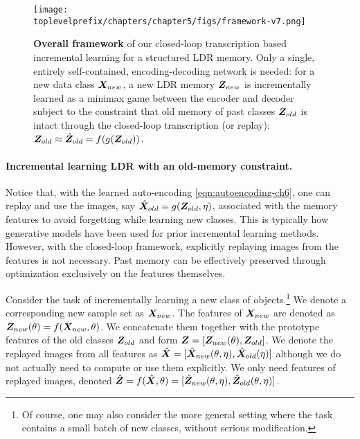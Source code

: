 \documentclass[\toplevelprefix/book-main.tex]{subfiles}
\begin{document}
\begin{figure*}[t]
\centering
\texttt{[image: \\toplevelprefix/chapters/chapter5/figs/framework-v7.png]}
\caption{\textbf{Overall framework} of our closed-loop transcription based incremental learning for a structured LDR memory. Only a single, entirely self-contained, encoding-decoding network is needed:  for a new data class $\bm{X}_{new}$, a new LDR memory $\bm{Z}_{new}$ is incrementally learned as a minimax game between the encoder and decoder subject to the constraint that old memory of past classes $\bm{Z}_{old}$ is intact through the closed-loop transcription (or replay): $\bm{Z}_{old} \approx \hat{\bm{Z}}_{old} = f(g(\bm{Z}_{old}))$.
\vspace{-0.2in}}
\label{fig:framework}
\end{figure*}

\paragraph{Incremental learning LDR with an old-memory constraint.} 
Notice that, with the learned auto-encoding \eqref{eqn:autoencoding-ch6}, one can replay and use the images, say $\hat{\bm{X}}_{old} = g(\bm{Z}_{old}, \eta)$, associated with the memory features  to avoid forgetting while learning new classes. This is typically how generative models have been used for prior incremental learning methods. However, with the closed-loop framework, explicitly replaying images from the features is not necessary. Past memory can be effectively preserved through optimization exclusively on the features themselves.

Consider the task of incrementally learning a new class of objects.\footnote{Of course, one may also consider the more general setting where the task contains a small batch of new classes, without serious modification.} We denote a corresponding new sample set as $\bm{X}_{new}$. The features of $\bm{X}_{new}$ are denoted as  $\bm{Z}_{new}(\theta) = f(\bm{X}_{new}, \theta)$. We concatenate them together with the prototype features of the old classes $\bm{Z}_{old}$ and form $\bm{Z} = [\bm{Z}_{new}(\theta), \bm{Z}_{old}]$. We denote the replayed images from all features as $\hat{\bm{X}} = [{\hat{\bm{X}}_{new}(\theta,\eta)}, {\hat{\bm{X}}_{old}(\eta)}]$ although we do not actually need to compute or use them explicitly. We only need features of replayed images, denoted $\hat{\bm{Z}} = f(\hat{\bm{X}}, \theta) =  [{\hat{\bm{Z}}_{new}(\theta,\eta)}, {\hat{\bm{Z}}_{old}(\theta,\eta)}]$. 
\end{document}

